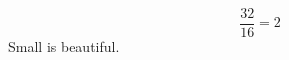 \documentclass{article}
\begin{document}
\begin{equation}\frac{32}{16}=2\end{equation}
Small is beautiful.
\end{document}
